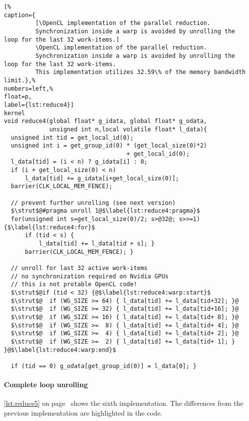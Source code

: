 \begin{lstlisting}[%
caption={
         [\OpenCL implementation of the parallel reduction.
         Synchronization inside a warp is avoided by unrolling the loop for the last 32 work-items.]
         \OpenCL implementation of the parallel reduction.
         Synchronization inside a warp is avoided by unrolling the loop for the last 32 work-items.
         This implementation utilizes 32.59\% of the memory bandwidth limit.},%
numbers=left,%
float=p,
label={lst:reduce4}]
kernel
void reduce4(global float* g_idata, global float* g_odata,
             unsigned int n,local volatile float* l_data){
  unsigned int tid = get_local_id(0);
  unsigned int i = get_group_id(0) * (get_local_size(0)*2)
                                   + get_local_id(0);
  l_data[tid] = (i < n) ? g_idata[i] : 0;
  if (i + get_local_size(0) < n)
      l_data[tid] += g_idata[i+get_local_size(0)];
  barrier(CLK_LOCAL_MEM_FENCE);

  // prevent further unrolling (see next version)
  $\strut$@#pragma unroll 1@$\label{lst:reduce4:pragma}$
  for(unsigned int s=get_local_size(0)/2; s>@32@; s>>=1) {$\label{lst:reduce4:for}$
      if (tid < s) {
          l_data[tid] += l_data[tid + s]; }
      barrier(CLK_LOCAL_MEM_FENCE); }

  // unroll for last 32 active work-items
  // no synchronization required on Nvidia GPUs
  // this is not protable OpenCL code!
  $\strut$@if (tid < 32) {@$\label{lst:reduce4:warp:start}$
  $\strut$@  if (WG_SIZE >= 64) { l_data[tid] += l_data[tid+32]; }@
  $\strut$@  if (WG_SIZE >= 32) { l_data[tid] += l_data[tid+16]; }@
  $\strut$@  if (WG_SIZE >= 16) { l_data[tid] += l_data[tid+ 8]; }@
  $\strut$@  if (WG_SIZE >=  8) { l_data[tid] += l_data[tid+ 4]; }@
  $\strut$@  if (WG_SIZE >=  4) { l_data[tid] += l_data[tid+ 2]; }@
  $\strut$@  if (WG_SIZE >=  2) { l_data[tid] += l_data[tid+ 1]; } }@$\label{lst:reduce4:warp:end}$

  if (tid == 0) g_odata[get_group_id(0)] = l_data[0]; }
\end{lstlisting}

\paragraph{Complete loop unrolling}

\autoref{lst:reduce5} on page~\pageref{lst:reduce5} shows the sixth implementation.
The differences from the previous implementation are highlighted in the code.

